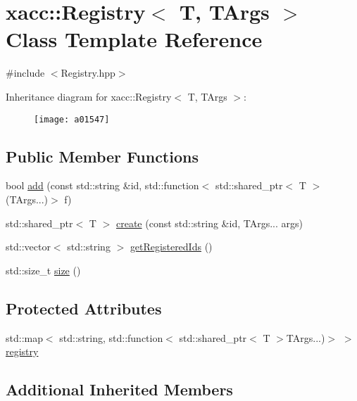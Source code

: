 \hypertarget{a01547}{}\section{xacc\+:\+:Registry$<$ T, T\+Args $>$ Class Template Reference}
\label{a01547}


{\ttfamily \#include $<$Registry.\+hpp$>$}

Inheritance diagram for xacc\+:\+:Registry$<$ T, T\+Args $>$\+:\begin{figure}[H]
\begin{center}
\leavevmode
\texttt{[image: a01547]}
\end{center}
\end{figure}
\subsection*{Public Member Functions}
\begin{DoxyCompactItemize}
\item 
bool \hyperlink{a01547_a9aa172c2603171db067b40bd62ba53c6}{add} (const std\+::string \&id, std\+::function$<$ std\+::shared\+\_\+ptr$<$ T $>$(T\+Args...)$>$ f)
\item 
std\+::shared\+\_\+ptr$<$ T $>$ \hyperlink{a01547_a3e71cc8d0effd065252608ee1ccdf207}{create} (const std\+::string \&id, T\+Args... args)
\item 
std\+::vector$<$ std\+::string $>$ \hyperlink{a01547_a8bff6f5c50534375abc4026662d69d2e}{get\+Registered\+Ids} ()
\item 
std\+::size\+\_\+t \hyperlink{a01547_a2352dd7c6c85ae5c5e232b577dfa2544}{size} ()
\end{DoxyCompactItemize}
\subsection*{Protected Attributes}
\begin{DoxyCompactItemize}
\item 
std\+::map$<$ std\+::string, std\+::function$<$ std\+::shared\+\_\+ptr$<$ T $>$T\+Args...)$>$ $>$ \hyperlink{a01547_a46460ecacc7facb6936b3c1ec6d618d7}{registry}
\end{DoxyCompactItemize}
\subsection*{Additional Inherited Members}


